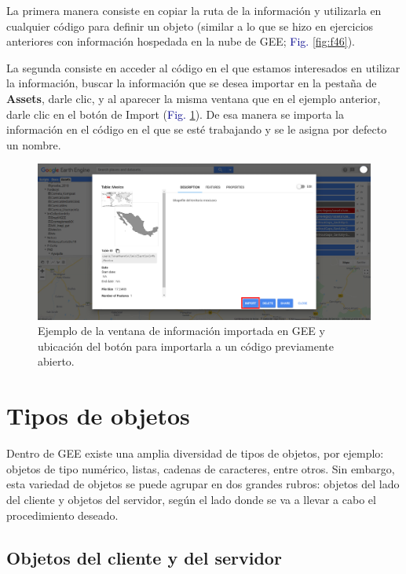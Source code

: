 \documentclass[
  12pt,
  letterpaper,
  twoside]{book}
\begin{document}
La primera manera consiste en copiar la ruta de la información y utilizarla en cualquier código para definir un objeto (similar a lo que se hizo en ejercicios anteriores con información hospedada en la nube de GEE; \textcolor{darkblue}{Fig.} \ref{fig:f46}).

La segunda consiste en acceder al código en el que estamos interesados en utilizar la información, buscar la información que se desea importar en la pestaña de \textbf{Assets}, darle clic, y al aparecer la misma ventana que en el ejemplo anterior, darle clic en el botón de Import (\textcolor{darkblue}{Fig.} \ref{fig:f47}). De esa manera se importa la información en el código en el que se esté trabajando y se le asigna por defecto un nombre.

\begin{figure}[H]

{\centering \includegraphics[width=0.95\linewidth]{Img/Asset_ruta2} 

}

\caption{Ejemplo de la ventana de información importada en GEE y ubicación del botón para importarla a un código previamente abierto.}\label{fig:f47}
\end{figure}

\newpage

\hypertarget{tipos-de-objetos}{%
\chapter{Tipos de objetos}\label{tipos-de-objetos}}

Dentro de GEE existe una amplia diversidad de tipos de objetos, por ejemplo: objetos de tipo numérico, listas, cadenas de caracteres, entre otros. Sin embargo, esta variedad de objetos se puede agrupar en dos grandes rubros: objetos del lado del cliente y objetos del servidor, según el lado donde se va a llevar a cabo el procedimiento deseado.

\hypertarget{objetos-del-cliente-y-del-servidor}{%
\section{Objetos del cliente y del servidor}\label{objetos-del-cliente-y-del-servidor}}
\end{document}
